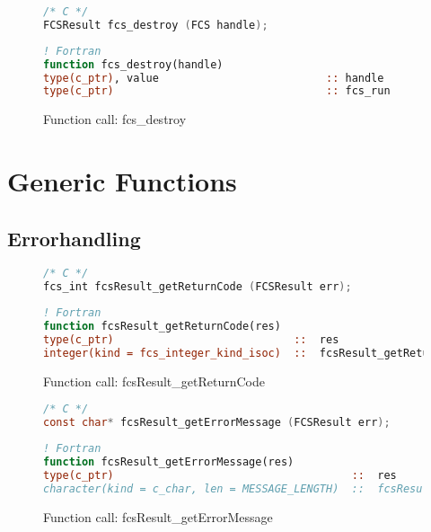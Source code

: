 \begin{figure}[htb]
\begin{lstlisting}[language=C,frame=trBL,breaklines,basicstyle=\ttfamily,prebreak={\raisebox{0ex}[0ex][0ex]{\ensuremath{\hookleftarrow}}}]
/* C */
FCSResult fcs_destroy (FCS handle);
\end{lstlisting}
\begin{lstlisting}[language=Fortran,frame=trBL,breaklines,basicstyle=\ttfamily,prebreak={\raisebox{0ex}[0ex][0ex]{\ensuremath{\hookleftarrow}}}]
! Fortran
function fcs_destroy(handle)
type(c_ptr), value                          :: handle
type(c_ptr)                                 :: fcs_run
\end{lstlisting}
\caption{Function call: fcs\_destroy}
\label{fig:fcs_destroy}
\end{figure}
\FloatBarrier
\section{Generic Functions}

\FloatBarrier
\subsection{Errorhandling}

\begin{figure}[htb]
\begin{lstlisting}[language=C,frame=trBL,breaklines,basicstyle=\ttfamily,prebreak={\raisebox{0ex}[0ex][0ex]{\ensuremath{\hookleftarrow}}}]
/* C */
fcs_int fcsResult_getReturnCode (FCSResult err);
\end{lstlisting}
\begin{lstlisting}[language=Fortran,frame=trBL,breaklines,basicstyle=\ttfamily,prebreak={\raisebox{0ex}[0ex][0ex]{\ensuremath{\hookleftarrow}}}]
! Fortran
function fcsResult_getReturnCode(res)
type(c_ptr)                            ::  res
integer(kind = fcs_integer_kind_isoc)  ::  fcsResult_getReturnCode
\end{lstlisting}
\caption{Function call: fcsResult\_getReturnCode}
\label{fig:fcsResult_getReturnCode}
\end{figure}

\begin{figure}[htb]
\begin{lstlisting}[language=C,frame=trBL,breaklines,basicstyle=\ttfamily,prebreak={\raisebox{0ex}[0ex][0ex]{\ensuremath{\hookleftarrow}}}]
/* C */
const char* fcsResult_getErrorMessage (FCSResult err);
\end{lstlisting}
\begin{lstlisting}[language=Fortran,frame=trBL,breaklines,basicstyle=\ttfamily,prebreak={\raisebox{0ex}[0ex][0ex]{\ensuremath{\hookleftarrow}}}]
! Fortran
function fcsResult_getErrorMessage(res)
type(c_ptr)                                     ::  res
character(kind = c_char, len = MESSAGE_LENGTH)  ::  fcsResult_getErrorMessage
\end{lstlisting}
\caption{Function call: fcsResult\_getErrorMessage}
\label{fig:fcsResult_getErrorMessage}
\end{figure}

